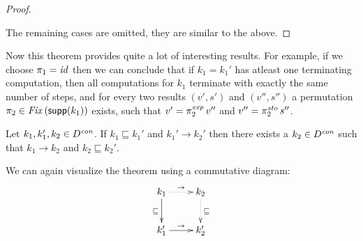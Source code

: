 \documentclass[12pt,a4paper]{report}
\newcommand{\scon}{\nstyle{con}}
\newcommand{\sexp}{\nstyle{exp}}
\newcommand{\ssto}{\nstyle{sto}}
\newcommand{\id}{\nstyle{id}}
\newcommand{\Fix}[1]{\nstyle{Fix}\,(#1)}
\begin{document}
\begin{proof}
\begin{itemize}
 \end{itemize}
 The remaining cases are omitted, they are similar to the above. 
\end{proof}

Now this theorem provides quite a lot of interesting results. For example, if we choose $\pi_1 = \id$ then we can
conclude that if $k_1 = k_1'$ has atleast one terminating computation, then all computations for $k_1$ terminate
with exactly the same number of steps, and for every two results $(v',s')$ and $(v'',s'')$ a permutation
$\pi_2 \in \Fix{\supp{k_1}}$ exists, such that $v' = \pi_2^\sexp\,v''$ and $v'' = \pi_2^\ssto\,s''$.

\begin{theorem} \label{theorem:small_steps_and_graph}
 Let $k_1,k_1',k_2\in D^\scon$. If $k_1 \sqsubseteq k_1'$ and $k_1' \to k_2'$ then
 there exists a $k_2 \in D^\scon$ such that $k_1 \to k_2$ and $k_2 \sqsubseteq k_2'$.
\end{theorem}

We can again visualize the theorem using a commutative diagram:
\[
 \xymatrix{
   k_1 \ar@{.>}[r]^{\to} \ar[d]_{\sqsubseteq} & k_2 \ar@{.>}[d]^{\sqsubseteq} \\
   k_1' \ar[r]^{\to} & k_2'
 }
\]
\end{document}
